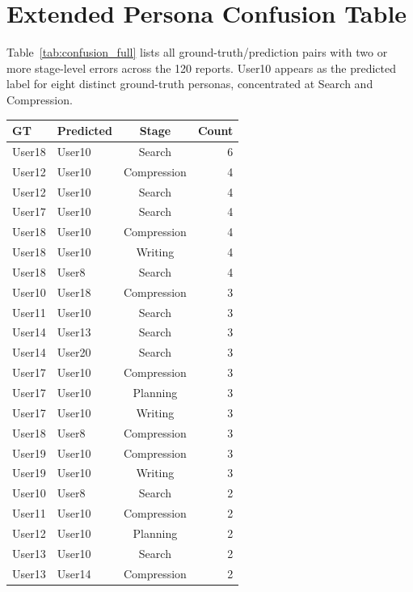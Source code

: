 \documentclass[]{article}
\begin{document}
\section{Extended Persona Confusion Table}
\label{app:confusion_full}

Table~\ref{tab:confusion_full} lists all ground-truth/prediction pairs with
two or more stage-level errors across the 120 reports. User10 appears as the
predicted label for eight distinct ground-truth personas, concentrated at
Search and Compression.

\begin{table}[!ht]
\centering
\small
\begin{tabular}{llcr}
\toprule
\textbf{GT} & \textbf{Predicted} & \textbf{Stage} & \textbf{Count} \\
\midrule
User18 & User10 & Search      & 6 \\
User12 & User10 & Compression & 4 \\
User12 & User10 & Search      & 4 \\
User17 & User10 & Search      & 4 \\
User18 & User10 & Compression & 4 \\
User18 & User10 & Writing     & 4 \\
User18 & User8  & Search      & 4 \\
User10 & User18 & Compression & 3 \\
User11 & User10 & Search      & 3 \\
User14 & User13 & Search      & 3 \\
User14 & User20 & Search      & 3 \\
User17 & User10 & Compression & 3 \\
User17 & User10 & Planning    & 3 \\
User17 & User10 & Writing     & 3 \\
User18 & User8  & Compression & 3 \\
User19 & User10 & Compression & 3 \\
User19 & User10 & Writing     & 3 \\
User10 & User8  & Search      & 2 \\
User11 & User10 & Compression & 2 \\
User12 & User10 & Planning    & 2 \\
User13 & User10 & Search      & 2 \\
User13 & User14 & Compression & 2 \\

\end{tabular}
\end{table}
\end{document}
